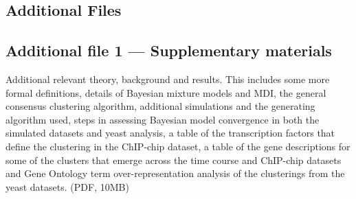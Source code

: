 \documentclass{bmcart}
\begin{document}
\begin{backmatter}

\vspace*{-12pt}


  

\section*{Additional Files}
\subsection*{Additional file 1 --- Supplementary materials}
Additional relevant theory, background and results. This includes some more formal definitions, details of Bayesian mixture models and MDI, the general consensus clustering algorithm, additional simulations and the generating algorithm used, steps in assessing Bayesian model convergence in both the simulated datasets and yeast analysis, a table of the transcription factors that define the clustering in the ChIP-chip dataset, a table of the gene descriptions for some of the clusters that emerge across the time course and ChIP-chip datasets and Gene Ontology term over-representation analysis of the clusterings from the yeast datasets. (PDF, 10MB)

\end{backmatter}
\end{document}
